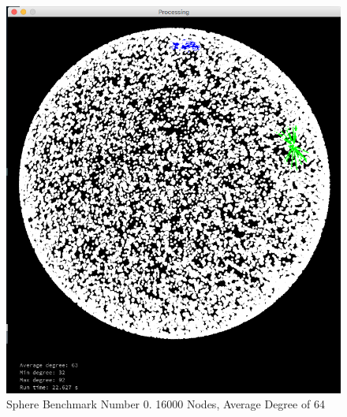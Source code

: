 \documentclass{article}
\begin{document}
\begin{center}
    \begin{figure}
        \includegraphics[scale=0.45]{./images/sphere_0.png}
        \caption{Sphere Benchmark Number 0. 16000 Nodes, Average Degree of 64}
        \label{sphere0}
    \end{figure}
\end{center}
\end{document}
